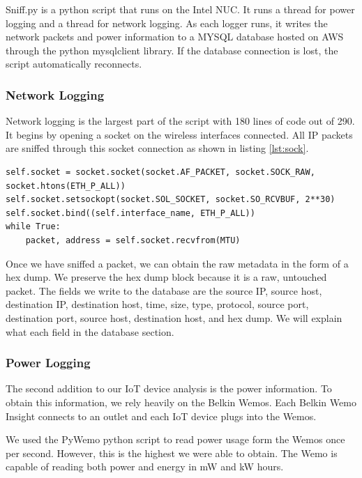 Sniff.py is a python script that runs on the Intel NUC. It runs a thread for power logging and a thread for network logging. As each logger runs, it writes the network packets and power information to a MYSQL database hosted on AWS through the python mysqlclient library. If the database connection is lost, the script automatically reconnects.

\subsubsection{Network Logging}

Network logging is the largest part of the script with 180 lines of code out of 290. It begins by opening a socket on the wireless interfaces connected. All IP packets are sniffed through this socket connection as shown in listing \ref{lst:sock}.

\begin{lstlisting}[label={lst:sock},caption={Open and Read from a Socket},captionpos=b]
self.socket = socket.socket(socket.AF_PACKET, socket.SOCK_RAW, socket.htons(ETH_P_ALL))
self.socket.setsockopt(socket.SOL_SOCKET, socket.SO_RCVBUF, 2**30)
self.socket.bind((self.interface_name, ETH_P_ALL))
while True:
    packet, address = self.socket.recvfrom(MTU)
\end{lstlisting}

Once we have sniffed a packet, we can obtain the raw metadata in the form of a hex dump. We preserve the hex dump block because it is a raw, untouched packet. The fields we write to the database are the source IP, source host, destination IP, destination host, time, size, type, protocol, source port, destination port, source host, destination host, and hex dump. We will explain what each field in the database section.

\subsubsection{Power Logging}

The second addition to our IoT device analysis is the power information. To obtain this information, we rely heavily on the Belkin Wemos. Each Belkin Wemo Insight connects to an outlet and each IoT device plugs into the Wemos.

We used the PyWemo python script to read power usage form the Wemos once per second. However, this is the highest we were able to obtain. The Wemo is capable of reading both power and energy in mW and kW hours.

